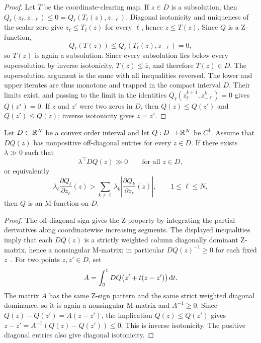 \begin{proof}
	Let \(T\) be the coordinate-clearing map.  If \(z\in D\) is a subsolution, then \(Q_\ell(z_\ell,z_{-\ell})\leq0=Q_\ell(T_\ell(z),z_{-\ell})\).  Diagonal isotonicity and uniqueness of the scalar zero give \(z_\ell\leq T_\ell(z)\) for every \(\ell\), hence \(z\leq T(z)\).  Since \(Q\) is a Z-function,
	\[
		Q_\ell(T(z))
		\leq
		Q_\ell(T_\ell(z),z_{-\ell})
		=0,
	\]
	so \(T(z)\) is again a subsolution.  Since every subsolution lies below every supersolution by inverse isotonicity, \(T(z)\leq\overline z\), and therefore \(T(z)\in D\).  The supersolution argument is the same with all inequalities reversed.  The lower and upper iterates are thus monotone and trapped in the compact interval \(D\).  Their limits exist, and passing to the limit in the identities \(Q_\ell(z_\ell^{k+1},z_{-\ell}^k)=0\) gives \(Q(z^\star)=0\).  If \(z\) and \(z'\) were two zeros in \(D\), then \(Q(z)\leq Q(z')\) and \(Q(z')\leq Q(z)\); inverse isotonicity gives \(z=z'\).
\end{proof}

\begin{prop}\label{prop-smooth-mfunction-certificate}
	Let \(D\subset\mathbb{R}^N\) be a convex order interval and let \(Q:D\to\mathbb{R}^N\) be \(C^1\).  Assume that \(DQ(z)\) has nonpositive off-diagonal entries for every \(z\in D\).  If there exists \(\lambda\gg0\) such that
	\[
		\lambda^\top DQ(z)\gg0
		\qquad\text{for all } z\in D,
	\]
	or equivalently
	\[
		\lambda_\ell\frac{\partial Q_\ell}{\partial z_\ell}(z)
		>
		\sum_{k\neq \ell}\lambda_k
		\left|\frac{\partial Q_k}{\partial z_\ell}(z)\right|,
		\qquad 1\leq \ell\leq N,
	\]
	then \(Q\) is an M-function on \(D\).
\end{prop}

\begin{proof}
	The off-diagonal sign gives the Z-property by integrating the partial derivatives along coordinatewise increasing segments.  The displayed inequalities imply that each \(DQ(z)\) is a strictly weighted column diagonally dominant Z-matrix, hence a nonsingular M-matrix; in particular \(DQ(z)^{-1}\geq0\) for each fixed \(z\)~\cite{Plemmons1977MMatrix}.  For two points \(z,z'\in D\), set
	\[
		A=\int_0^1 DQ\big(z'+t(z-z')\big)\,\mathrm{d} t .
	\]
	The matrix \(A\) has the same Z-sign pattern and the same strict weighted diagonal dominance, so it is again a nonsingular M-matrix and \(A^{-1}\geq0\).  Since \(Q(z)-Q(z')=A(z-z')\), the implication \(Q(z)\leq Q(z')\) gives \(z-z'=A^{-1}(Q(z)-Q(z'))\leq0\).  This is inverse isotonicity.  The positive diagonal entries also give diagonal isotonicity.
\end{proof}

